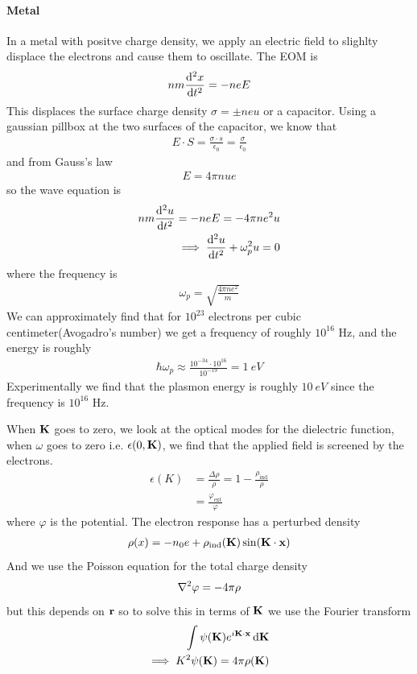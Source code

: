\documentclass[../main.tex]{subfiles}
\begin{document}
\paragraph*{Metal} In a metal with positve charge density, we apply an electric field to slighlty
displace the electrons and cause them to oscillate. The EOM is
\begin{align*}
    n m \dv[2]{x}{t} = -neE
\end{align*}
This displaces the surface charge density $\sigma = \pm neu$ or a capacitor. Using a gaussian pillbox at the 
two surfaces of the capacitor, we know that
\begin{align*}
    E \cdot S = \frac{\sigma \cdot s}{\epsilon_0} = \frac{\sigma}{\epsilon_0}
\end{align*}
and from Gauss's law
\begin{align*}
    E = 4\pi n u e
\end{align*}
so the wave equation is
\begin{align*}
    nm\dv[2]{u}{t} = -neE = -4\pi ne^2 u \\
    \implies \dv[2]{u}{t} + \omega_p^2 u = 0
\end{align*}
where the frequency is
\begin{align*}
    \omega_p = \sqrt{\frac{4\pi ne^2}{m}}
\end{align*}
We can approximately find that for $10^{23}$ electrons per cubic centimeter(Avogadro's number) we 
get a frequency of roughly $10^{16}$ Hz, and the energy is roughly
\begin{align*}
    \hbar \omega_p \approx \frac{10^{-34} \cdot 10^{16}}{10^{-19}} = \qty{1}{eV}
\end{align*}
Experimentally we find that the plasmon energy is roughly $\qty{10}{eV}$ since the frequency is
$10^{16}$ Hz. 

\newpage
{}
When $\vb K$ goes to zero, we look at the optical modes for the dielectric function, when $\omega$
goes to zero i.e. $\epsilon(0, \vb K)$, we find that the applied field is screened by the electrons.
\begin{align*}
    \epsilon(K) &= \frac{\Delta \rho}{\rho} = 1 - \frac{\rho_{\text{ind}}}{\rho} \\
    &= \frac{\varphi_{\text{ext}}}{\varphi}
\end{align*}
where $\varphi$ is the potential. The electron response has a perturbed density
\begin{align*}
    \rho(x) = -n_0 e + \rho_{\text{ind}}(\vb K)\sin(\vb K \cdot \vb x)
\end{align*}
And we use the Poisson equation for the total charge density
\begin{align*}
    \laplacian \varphi = -4\pi \rho
\end{align*}
but this depends on $\vb r$ so to solve this in terms of $\vb K$ we use the Fourier transform
\begin{align*}
    \int \psi(\vb K) e^{i\vb K \cdot \vb x} \dd{\vb K} \\
    \implies K^2 \psi(\vb K) = 4\pi \rho(\vb K)
\end{align*}
\end{document}
